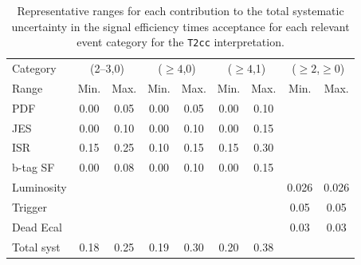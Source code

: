 \begin{table}[h!]
  \caption{Representative ranges for each contribution to the total
    systematic uncertainty in the signal efficiency times acceptance
    for each relevant event category for the \texttt{T2cc}
    interpretation.
    \label{tab:sms-syst-t2cc}
  }   
  \centering
  \begin{tabular}{ lcccccccc }
    \hline
    \hline
    Category   & \multicolumn{2}{c}{(2--3,0)} & \multicolumn{2}{c}{($\geq 4$,0)} & \multicolumn{2}{c}{($\geq 4$,1)} & \multicolumn{2}{c}{($\geq 2$,$\geq 0$)} \\
    Range      & Min.   & Max.                & Min.   & Max.                    & Min. & Max.                      & Min.  & Max.        \\
    \hline
    PDF        & 0.00   & 0.05                & 0.00   & 0.05                    & 0.00 & 0.10                      &         \\
    JES        & 0.00   & 0.10                & 0.00   & 0.10                    & 0.00 & 0.15 	                    &             \\
    ISR        & 0.15   & 0.25                & 0.10   & 0.15                    & 0.15 & 0.30 	                    &             \\
    b-tag SF   & 0.00   & 0.08                & 0.00   & 0.10                    & 0.00 & 0.15 	                    &             \\
    Luminosity &        &                     &        &                         &      &      	                    & 0.026 & 0.026        \\
    Trigger    &        &                     &        &                         &      &                           & 0.05 & 0.05        \\
    Dead Ecal  &        &                     &        &                         &      &      	                    & 0.03 & 0.03        \\
    \hline
    Total syst & 0.18   & 0.25                & 0.19   & 0.30                    & 0.20 & 0.38                      &      &             \\
    \hline
    \hline
  \end{tabular}
\end{table}


